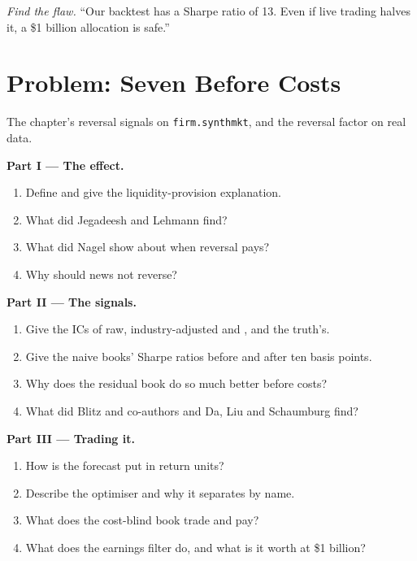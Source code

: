 \begin{exercise}[$\star\star\star$]\label{exo:s1:short-term-reversal:8}
\emph{Find the flaw.} ``Our  backtest has a Sharpe ratio of 13. Even if live trading halves it, a \$1 billion allocation is safe.''
\end{exercise}

\section{Problem: Seven Before Costs}

\begin{problem}\label{pb:s1:short-term-reversal:1}
The chapter's reversal signals on \texttt{firm.synthmkt}, and the reversal factor on real data.

\medskip\noindent\textbf{Part I --- The effect.}
\begin{enumerate}
\item Define  and give the liquidity-provision explanation.
\item What did Jegadeesh and Lehmann find?
\item What did Nagel show about when reversal pays?
\item Why should news not reverse?
\end{enumerate}

\medskip\noindent\textbf{Part II --- The signals.}
\begin{enumerate}[resume]
\item Give the ICs of raw, industry-adjusted and , and the truth's.
\item Give the naive books' Sharpe ratios before and after ten basis points.
\item Why does the residual book do so much better before costs?
\item What did Blitz and co-authors and Da, Liu and Schaumburg find?
\end{enumerate}

\medskip\noindent\textbf{Part III --- Trading it.}
\begin{enumerate}[resume]
\item How is the forecast put in return units?
\item Describe the optimiser and why it separates by name.
\item What does the cost-blind book trade and pay?
\item What does the earnings filter do, and what is it worth at \$1 billion?
\end{enumerate}


\end{problem}
